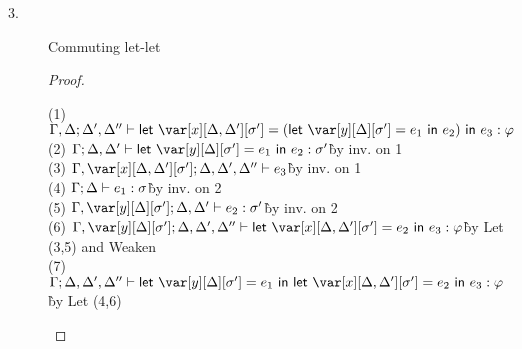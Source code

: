 \begin{description}
\item[3.] Commuting let-let
\begin{proof}~
\begin{tabbing}
    (1) $\G, \D;\D',\D'' \vdash \llet{\x[\D,\D'][\s'] = (\llet{\yD = e_1}{e_2})}{e_3} : \vp$\\
    (2) $\G; \D, \D' \vdash \llet{\yD = e_1}{e_2} : \s'$\`by inv. on 1\\
    (3) $\G, \x[\D,\D'][\s'];\D,\D',\D'' \vdash e_3$\`by inv. on 1\\
    (4) $\Gamma; \Delta \vdash e_1 : \sigma$\`by inv. on 2\\
    (5) $\G, \yD; \D,\D' \vdash e_2 : \s'$\`by inv. on 2\\
    (6) $\G, \yD; \D,\D',\D'' \vdash \llet{\x[\D,\D'][\s'] = e_2}{e_3} : \vp$\`by Let (3,5) and Weaken\\
    (7) $\G; \D,\D',\D'' \vdash \llet{\yD = e_1}{\llet{\x[\D,\D'][\s'] = e_2}{e_3}} : \vp$\`by Let (4,6)\\
\end{tabbing}
\end{proof}
\end{description}




